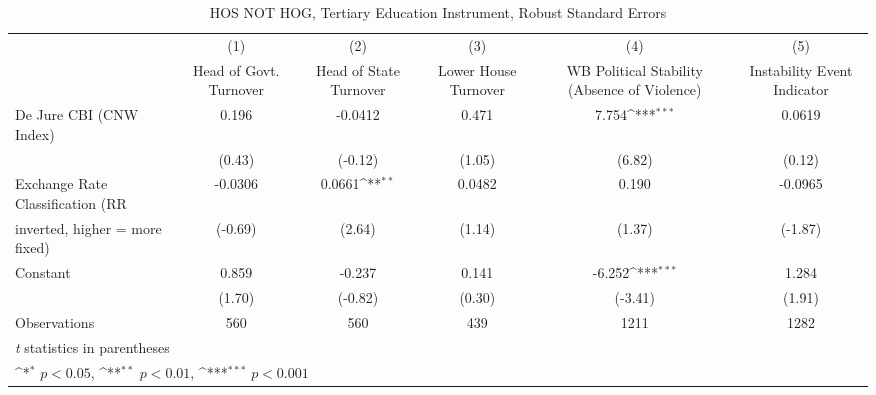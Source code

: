 \begin{table}[htbp]\centering
\def\sym#1{\ifmmode^{#1}\else\(^{#1}\)\fi}
\caption{HOS NOT HOG, Tertiary Education Instrument, Robust Standard Errors \label{NOhoshogIfivs}}
\begin{tabular}{l*{5}{c}}
\toprule
                                        &\multicolumn{1}{c}{(1)}&\multicolumn{1}{c}{(2)}&\multicolumn{1}{c}{(3)}&\multicolumn{1}{c}{(4)}&\multicolumn{1}{c}{(5)}\\
                                        &\multicolumn{1}{c}{Head of Govt. Turnover}&\multicolumn{1}{c}{Head of State Turnover}&\multicolumn{1}{c}{Lower House Turnover}&\multicolumn{1}{c}{WB Political Stability (Absence of Violence)}&\multicolumn{1}{c}{Instability Event Indicator}\\
\midrule
De Jure CBI (CNW Index)                 &    0.196         &  -0.0412         &    0.471         &    7.754\sym{***}&   0.0619         \\
                                        &   (0.43)         &  (-0.12)         &   (1.05)         &   (6.82)         &   (0.12)         \\
\addlinespace
Exchange Rate Classification (RR        &  -0.0306         &   0.0661\sym{**} &   0.0482         &    0.190         &  -0.0965         \\
inverted, higher = more fixed)          &  (-0.69)         &   (2.64)         &   (1.14)         &   (1.37)         &  (-1.87)         \\
\addlinespace
Constant                                &    0.859         &   -0.237         &    0.141         &   -6.252\sym{***}&    1.284         \\
                                        &   (1.70)         &  (-0.82)         &   (0.30)         &  (-3.41)         &   (1.91)         \\
\midrule
Observations                            &      560         &      560         &      439         &     1211         &     1282         \\
\bottomrule
\multicolumn{6}{l}{\footnotesize \textit{t} statistics in parentheses}\\
\multicolumn{6}{l}{\footnotesize \sym{*} \(p<0.05\), \sym{**} \(p<0.01\), \sym{***} \(p<0.001\)}\\
\end{tabular}
\end{table}
